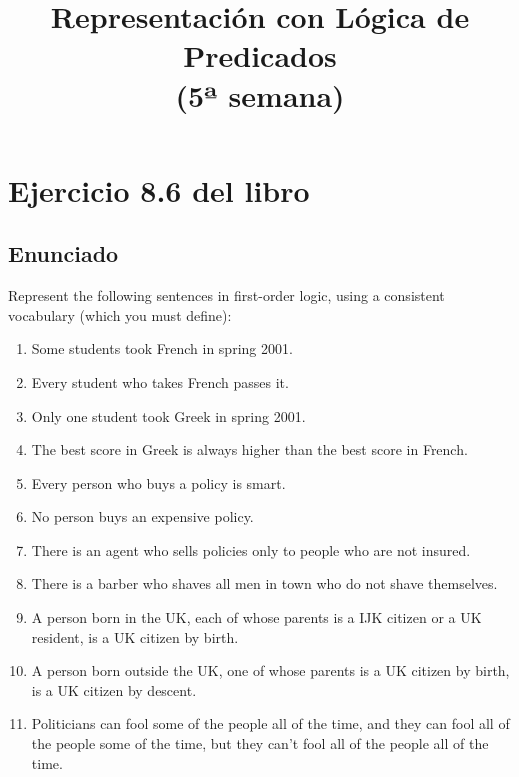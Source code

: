 \documentclass[a4paper,10pt]{article}
\title{Representación con Lógica de Predicados\\(5ª semana)}
\author{}
\begin{document}
\maketitle
\pagebreak
\tableofcontents
\pagebreak

\section{Ejercicio 8.6 del libro}
\subsection{Enunciado}
Represent the following sentences in first-order logic, using a consistent vocabulary
(which you must define):
\begin{enumerate}
    \item Some students took French in spring 2001.
    \item Every student who takes French passes it.
    \item Only one student took Greek in spring 2001.
    \item The best score in Greek is always higher than the best score in French.
    \item Every person who buys a policy is smart.
    \item No person buys an expensive policy.
    \item There is an agent who sells policies only to people who are not insured.
    \item There is a barber who shaves all men in town who do not shave themselves.
    \item A person born in the UK, each of whose parents is a IJK citizen or a UK resident, is a UK citizen by birth.
    \item A person born outside the UK, one of whose parents is a UK citizen by birth, is a UK citizen by descent.
    \item Politicians can fool some of the people all of the time, and they can fool all of the people some of the time, but they can't fool all of the people all of the time.
\end{enumerate}
\end{document}
